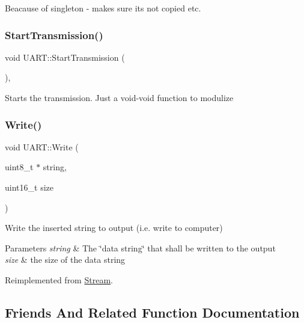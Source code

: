 Beacause of singleton -\/ makes sure its not copied etc. \hypertarget{class_u_a_r_t_a0569d0267f8045907cedb527b5082fe0}{}\label{class_u_a_r_t_a0569d0267f8045907cedb527b5082fe0} 
\subsubsection{\texorpdfstring{Start\+Transmission()}{StartTransmission()}}
{\footnotesize\ttfamily void U\+A\+R\+T\+::\+Start\+Transmission (\begin{DoxyParamCaption}{ }\end{DoxyParamCaption})\hspace{0.3cm}{\ttfamily [inline]}, {\ttfamily [private]}}

Starts the transmission. Just a void-\/void function to modulize \hypertarget{class_u_a_r_t_a8bb77ca27b4e17d608d2743313625ac4}{}\label{class_u_a_r_t_a8bb77ca27b4e17d608d2743313625ac4} 
\subsubsection{\texorpdfstring{Write()}{Write()}}
{\footnotesize\ttfamily void U\+A\+R\+T\+::\+Write (\begin{DoxyParamCaption}\item[{uint8\+\_\+t $\ast$}]{string,  }\item[{uint16\+\_\+t}]{size }\end{DoxyParamCaption})\hspace{0.3cm}{\ttfamily [virtual]}}

Write the inserted string to output (i.\+e. write to computer) 
\begin{DoxyParams}{Parameters}
{\em string} & The \char`\"{}data string\char`\"{} that shall be written to the output \\
\hline
{\em size} & the size of the data string \\
\hline
\end{DoxyParams}


Reimplemented from \hyperlink{class_stream_a508be3423e4d99ab2757275fb723002a}{Stream}.



\subsection{Friends And Related Function Documentation}
\hypertarget{class_u_a_r_t_accc13d37cd82c841e387e1d5cf4d9a94}{}\label{class_u_a_r_t_accc13d37cd82c841e387e1d5cf4d9a94} 
